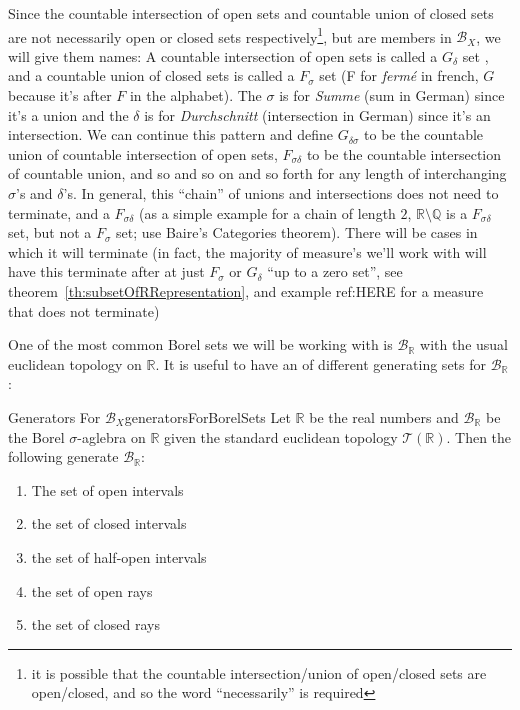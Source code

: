 \documentclass[oneside]{book}
\newcommand{\Q}{\mathbb{Q}}
\newcommand{\R}{\mathbb{R}}
\newcommand{\BB}{\mathcal{B}}
\newcommand{\TT}{\mathcal{T}}
\begin{document}
Since the countable intersection of open sets and countable union of closed sets are not necessarily  open or closed sets
respectively\footnote{it is possible that the countable intersection/union of open/closed sets are open/closed, and so
the word ``necessarily'' is required}, but are members in $\BB_X$, we will give them names: A countable intersection of open sets is called
a $G_{\delta}$ set , and a countable union of closed sets is called a $F_\sigma$ set (F for \emph{ferm\'e}  in french,
$G$ because it's after $F$ in the alphabet). The $\sigma$ is for \emph{Summe} (sum in German) since it's a union
and the $\delta$ is for \emph{Durchschnitt} (intersection in German) since it's an intersection. We can continue this
pattern and define $G_{\delta \sigma}$ to be the countable union of countable intersection of open sets, $F_{\sigma
\delta}$ to be the countable intersection of countable union, and so and so on and so forth for any length of
interchanging $\sigma$'s and $\delta$'s. In general, this ``chain'' of unions and intersections does not need to
terminate, and a $F_{\sigma \delta}$ (as a simple example for a chain of length $2$, $\R\setminus \Q$ is
a $F_{\sigma\delta}$ set, but not a $F_\sigma$ set; use Baire's Categories theorem).
There will be cases in which it will terminate (in fact, the majority of measure's we'll work with will have this
terminate after at just $F_\sigma$ or $G_\delta$ ``up to a zero set'', see theorem~\ref{th:subsetOfRRepresentation}, and
example ref:HERE for a measure that does not terminate)

One of the most common Borel sets we will be working with is $\BB_\R$ with the usual euclidean topology on $\R$. It is
useful to have an of different generating sets for $\BB_\R$:

\begin{prop}{Generators For $\BB_X$}{generatorsForBorelSets}
	Let $\R$ be the real numbers and $\BB_\R$ be the Borel $\sigma$-aglebra on $\R$ given the standard euclidean
	topology $\TT(\R)$. Then the following generate $\BB_\R$:
	\begin{enumerate}
		\item The set of open intervals
		\item the set of closed intervals
		\item the set of half-open intervals
		\item the set of open rays
		\item the set of closed rays
	\end{enumerate}
\end{prop}
\end{document}
